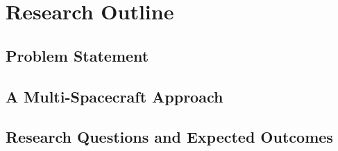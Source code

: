 \chapter{Research Outline}

\section{Problem Statement}

\section{A Multi-Spacecraft Approach}

\section{Research Questions and Expected Outcomes}
